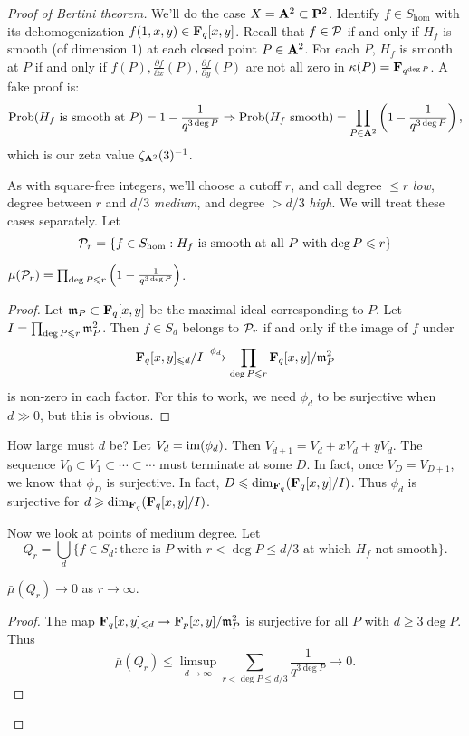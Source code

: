 \begin{proof}[Proof of Bertini theorem]
We'll do the case $X=\mathbf{A}^2\subset \mathbf{P}^2$. Identify $f\in S_{\hom}$ with its 
dehomogenization $f(1,x,y)\in \mathbf{F}_q[x,y]$. Recall that $f\in \mathcal{P}$ if and only 
if $H_f$ is smooth (of dimension $1$) at each closed point $P\in \mathbf{A}^2$. For 
each $P$, $H_f$ is smooth at $P$ if and only if 
$f(P), \frac{\partial f}{\partial x}(P), \frac{\partial f}{\partial y}(P)$ are 
not all zero in $\kappa(P)=\mathbf{F}_{q^{\deg P}}$. A fake proof is: 
\[
  \operatorname{Prob}(H_f\text{ is smooth at }P) = 1-\frac{1}{q^{3\deg P}} \Rightarrow \operatorname{Prob}(H_f\text{ smooth}) = \prod_{P\in \mathbf{A}^2}\left(1-\frac{1}{q^{3\deg P}}\right) ,
\]
which is our zeta value $\zeta_{\mathbf{A}^2}(3)^{-1}$. 

As with square-free integers, we'll choose a cutoff $r$, and call degree 
$\leq r$ \emph{low}, degree between $r$ and $d/3$ \emph{medium}, and degree 
$>d/3$ \emph{high}. We will treat these cases separately. Let 
\[
  \mathcal{P}_r = \{f\in S_{\hom}:H_f\text{ is smooth at all $P$ with $\deg P\leqslant r$}\}
\]

\begin{lemma}
$\mu(\mathcal{P}_r) = \prod_{\deg P\leqslant r} \left(1-\frac{1}{q^{3\deg P}}\right)$. 
\end{lemma}
\begin{proof}
Let $\mathfrak{m}_P\subset \mathbf{F}_q[x,y]$ be the maximal ideal corresponding to $P$. Let 
$I=\prod_{\deg P\leqslant r} \mathfrak{m}_P^2$. Then $f\in S_d$ belongs to $\mathcal{P}_r$ if and 
only if the image of $f$ under  
\[
  \mathbf{F}_q[x,y]_{\leqslant d} / I \xrightarrow{\phi_d} \prod_{\deg P\leqslant r} \mathbf{F}_q[x,y]/\mathfrak{m}_P^2
\]
is non-zero in each factor. For this to work, we need $\phi_d$ to be 
surjective when $d\gg 0$, but this is obvious. 
\end{proof}

How large must $d$ be? Let $V_d=\operatorname{im}(\phi_d)$. Then $V_{d+1}=V_d+x V_d+y V_d$. 
The sequence $V_0\subset V_1\subset \cdots \subset \cdots$ must terminate at 
some $D$. In fact, once $V_D=V_{D+1}$, we know that $\phi_D$ is surjective. In 
fact, $D\leqslant \dim_{\mathbf{F}_q}(\mathbf{F}_q[x,y]/I)$. Thus $\phi_d$ is surjective for 
$d\geqslant \dim_{\mathbf{F}_q}(\mathbf{F}_q[x,y]/I)$. 

Now we look at points of medium degree. Let 
\[
  Q_r = \bigcup_d \{f\in S_d : \text{there is $P$ with $r<\deg P\leq d/3$ at which $H_f$ not smooth}\} .
\]
\begin{lemma}
$\bar\mu(Q_r)\to 0$ as $r\to \infty$. 
\end{lemma}
\begin{proof}
The map $\mathbf{F}_q[x,y]_{\leqslant d} \to \mathbf{F}_p[x,y]/\mathfrak{m}_P^2$ is surjective for all 
$P$ with $d\geq 3\deg P$. Thus 
\[
  \bar\mu(Q_r) \leq \limsup_{d\to \infty} \sum_{r<\deg P\leq d/3} \frac{1}{q^{3\deg P}} \to 0 .
\]
\end{proof}


\end{proof}
